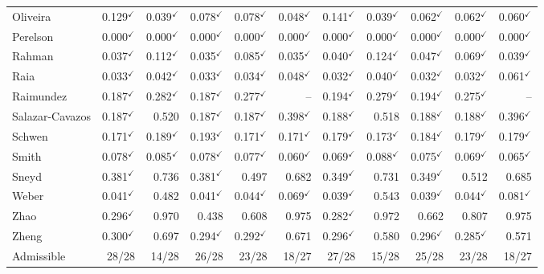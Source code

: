 \begin{longtable}{@{}lrrrrr|rrrrr@{}}
Oliveira & 0.129$^{\checkmark}$ & 0.039$^{\checkmark}$ & 0.078$^{\checkmark}$ & 0.078$^{\checkmark}$ & 0.048$^{\checkmark}$ & 0.141$^{\checkmark}$ & 0.039$^{\checkmark}$ & 0.062$^{\checkmark}$ & 0.062$^{\checkmark}$ & 0.060$^{\checkmark}$ \\
Perelson & 0.000$^{\checkmark}$ & 0.000$^{\checkmark}$ & 0.000$^{\checkmark}$ & 0.000$^{\checkmark}$ & 0.000$^{\checkmark}$ & 0.000$^{\checkmark}$ & 0.000$^{\checkmark}$ & 0.000$^{\checkmark}$ & 0.000$^{\checkmark}$ & 0.000$^{\checkmark}$ \\
Rahman & 0.037$^{\checkmark}$ & 0.112$^{\checkmark}$ & 0.035$^{\checkmark}$ & 0.085$^{\checkmark}$ & 0.035$^{\checkmark}$ & 0.040$^{\checkmark}$ & 0.124$^{\checkmark}$ & 0.047$^{\checkmark}$ & 0.069$^{\checkmark}$ & 0.039$^{\checkmark}$ \\
Raia & 0.033$^{\checkmark}$ & 0.042$^{\checkmark}$ & 0.033$^{\checkmark}$ & 0.034$^{\checkmark}$ & 0.048$^{\checkmark}$ & 0.032$^{\checkmark}$ & 0.040$^{\checkmark}$ & 0.032$^{\checkmark}$ & 0.032$^{\checkmark}$ & 0.061$^{\checkmark}$ \\
Raimundez & 0.187$^{\checkmark}$ & 0.282$^{\checkmark}$ & 0.187$^{\checkmark}$ & 0.277$^{\checkmark}$ & -- & 0.194$^{\checkmark}$ & 0.279$^{\checkmark}$ & 0.194$^{\checkmark}$ & 0.275$^{\checkmark}$ & -- \\
Salazar-Cavazos & 0.187$^{\checkmark}$ & 0.520 & 0.187$^{\checkmark}$ & 0.187$^{\checkmark}$ & 0.398$^{\checkmark}$ & 0.188$^{\checkmark}$ & 0.518 & 0.188$^{\checkmark}$ & 0.188$^{\checkmark}$ & 0.396$^{\checkmark}$ \\
Schwen & 0.171$^{\checkmark}$ & 0.189$^{\checkmark}$ & 0.193$^{\checkmark}$ & 0.171$^{\checkmark}$ & 0.171$^{\checkmark}$ & 0.179$^{\checkmark}$ & 0.173$^{\checkmark}$ & 0.184$^{\checkmark}$ & 0.179$^{\checkmark}$ & 0.179$^{\checkmark}$ \\
Smith & 0.078$^{\checkmark}$ & 0.085$^{\checkmark}$ & 0.078$^{\checkmark}$ & 0.077$^{\checkmark}$ & 0.060$^{\checkmark}$ & 0.069$^{\checkmark}$ & 0.088$^{\checkmark}$ & 0.075$^{\checkmark}$ & 0.069$^{\checkmark}$ & 0.065$^{\checkmark}$ \\
Sneyd & 0.381$^{\checkmark}$ & 0.736 & 0.381$^{\checkmark}$ & 0.497 & 0.682 & 0.349$^{\checkmark}$ & 0.731 & 0.349$^{\checkmark}$ & 0.512 & 0.685 \\
Weber & 0.041$^{\checkmark}$ & 0.482 & 0.041$^{\checkmark}$ & 0.044$^{\checkmark}$ & 0.069$^{\checkmark}$ & 0.039$^{\checkmark}$ & 0.543 & 0.039$^{\checkmark}$ & 0.044$^{\checkmark}$ & 0.081$^{\checkmark}$ \\
Zhao & 0.296$^{\checkmark}$ & 0.970 & 0.438 & 0.608 & 0.975 & 0.282$^{\checkmark}$ & 0.972 & 0.662 & 0.807 & 0.975 \\
Zheng & 0.300$^{\checkmark}$ & 0.697 & 0.294$^{\checkmark}$ & 0.292$^{\checkmark}$ & 0.671 & 0.296$^{\checkmark}$ & 0.580 & 0.296$^{\checkmark}$ & 0.285$^{\checkmark}$ & 0.571 \\
\midrule Admissible & 28/28 & 14/28 & 26/28 & 23/28 & 18/27 & 27/28 & 15/28 & 25/28 & 23/28 & 18/27 \\
\bottomrule
\end{longtable}
